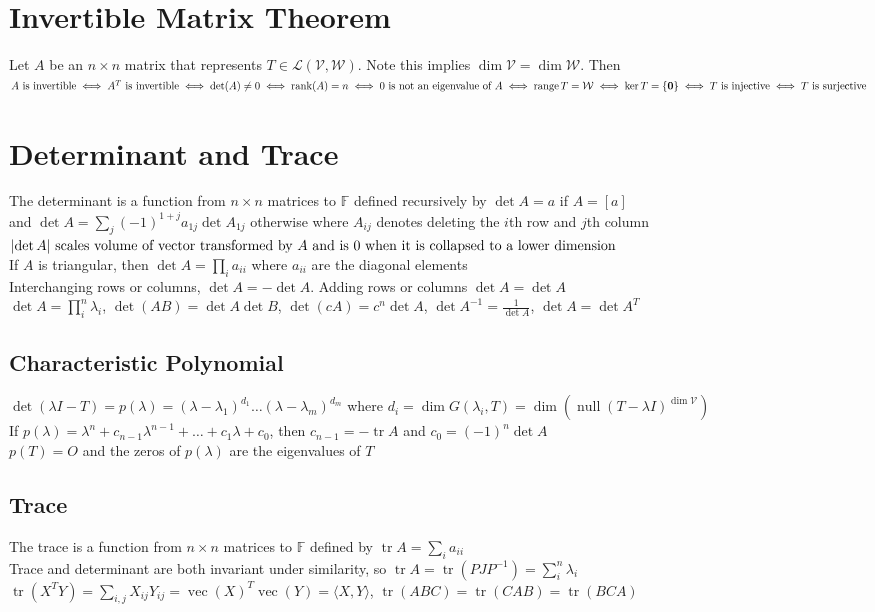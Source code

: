\documentclass{article}
\DeclarePairedDelimiter\abs{\lvert}{\rvert}%
\DeclareMathOperator{\rank}{rank}
\DeclareMathOperator{\range}{range}
\DeclareMathOperator{\nullspace}{null}
\DeclareMathOperator{\tr}{tr}
\DeclareMathOperator{\vect}{vec}
\newcommand{\F}{\mathbb{F}}
\newcommand{\linear}{\mathcal{L}}
\newcommand{\V}{\mathcal{V}}
\newcommand{\W}{\mathcal{W}}
\newcommand\inner[2]{\langle #1, #2 \rangle}
\begin{document}
\section{Invertible Matrix Theorem}
Let $A$ be an $n \times n$ matrix that represents $T \in \linear(\V, \W)$. Note this implies $\dim \V = \dim \W$. Then \\
$A \mbox{ is invertible} \iff A^T \mbox{ is invertible} \iff \det(A) \neq 0 \iff \rank(A) = n \iff 0 \mbox{ is not an eigenvalue of } A \\ \iff \range T = \W \iff \ker T = \{ \boldsymbol{0} \} \iff T \mbox{ is injective} \iff T \mbox{ is surjective}$

\section{Determinant and Trace}
The determinant is a function from $n \times n$ matrices to $\F$ defined recursively by $\det A = a$ if $A = [a]$ \\ 
and $\det A = \sum_j (-1)^{1+j}a_{1j} \det A_{1j}$ otherwise where $A_{ij}$ denotes deleting the $i$th row and $j$th column \\
$\abs {\det A} \mbox{ scales volume of vector transformed by $A$ and is 0 when it is collapsed to a lower dimension}$ \\
If $A$ is triangular, then $\det A = \prod_i a_{ii}$ where $a_{ii}$ are the diagonal elements \\
Interchanging rows or columns, $\det A = - \det A$. Adding rows or columns $\det A = \det A$ \\
$\det A = \prod_i^n \lambda_i $, $\det (AB) = \det A \det B$, $\det (cA) = c^n \det A$, $\det A^{-1} = \frac{1}{\det A}$, $\det A = \det A^T$

\subsection{Characteristic Polynomial}
$\det(\lambda I - T) = p(\lambda) = (\lambda-\lambda_1)^{d_1} \ldots (\lambda-\lambda_m)^{d_m}$ where $d_i = \dim G(\lambda_i, T) = \dim (\nullspace (T- \lambda I)^{\dim \V})$ \\
If $p(\lambda) = \lambda^n + c_{n-1}\lambda^{n-1} + \ldots + c_1\lambda + c_0$, then $c_{n-1} = -\tr A$ and $c_0 = (-1)^n \det A$ \\
$p(T) = O$ and the zeros of $p(\lambda)$ are the eigenvalues of $T$

\subsection{Trace}
The trace is a function from $n \times n$ matrices to $\F$ defined by $\tr A = \sum_i a_{ii}$ \\
Trace and determinant are both invariant under similarity, so $\tr A =  \tr (PJP^{-1}) = \sum_i^n \lambda_i $ \\
$\tr (X^TY) = \sum_{i, j} X_{ij}Y_{ij} = \vect (X)^T \vect(Y) = \inner{X}{Y}$, $\tr (ABC) = \tr(CAB) = \tr(BCA)$ 
\end{document}
